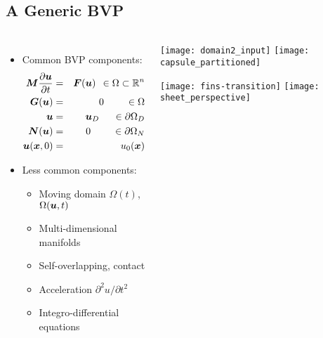\subsection*{A Generic BVP}

\begin{frame}[t]
  \begin{columns}[t]
     \begin{itemize}
      \item Common BVP components:
      \vspace{-.1in}
        \begin{eqnarray}
        \label{eqn:general_pde}
        \nonumber
        {\boldsymbol{M}} \frac{\partial {\boldsymbol{u}}}{\partial t} & = & {\boldsymbol{F}}( {\boldsymbol{u}} ) \;\, \in \Omega \subset \mathbb{R}^n
        \\
        \nonumber
        {\boldsymbol{G}}( {\boldsymbol{u}} ) & = & 0 \;\;\;\;\;\;\;\; \in \Omega
        \\
        \nonumber
        {\boldsymbol{u}} & = & {\boldsymbol{u}}_D \;\;\;\;\; \in \partial \Omega_D
        \\
        \nonumber
        {\boldsymbol{N}}({\boldsymbol{u}}) & = & 0 \;\;\;\;\;\;\;\; \in \partial \Omega_N
        \\
        \nonumber
        {\boldsymbol{u}}({\boldsymbol{x}}, 0) & = & u_0({\boldsymbol{x}}) 
      \end{eqnarray}
      \item Less common components:
        \begin{itemize}
        \item Moving domain $\Omega(t)$, $\Omega({\boldsymbol{u}},t)$
        \item Multi-dimensional manifolds
        \item Self-overlapping, contact
        \item Acceleration ${\partial^2 u}/{\partial t^2}$
        \item Integro-differential equations
        \end{itemize}
      \end{itemize}
      \begin{center}
        \texttt{[image: domain2\_input]}
        \texttt{[image: capsule\_partitioned]}

        \texttt{[image: fins-transition]} \;
        \texttt{[image: sheet\_perspective]}

      \end{center}
  \end{columns}
\end{frame}

